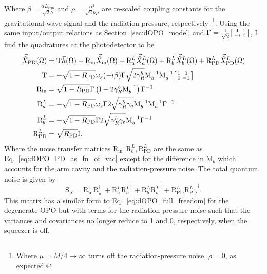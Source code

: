 Where $\beta = \frac{\alpha L_\mathrm{arm}}{\sqrt{2}\hbar}$ and $\rho = \frac{\alpha^2}{\sqrt{2}\hbar\mu}$ are re-scaled coupling constants for the gravitational-wave signal and the radiation pressure, respectively~\footnote{Where $\mu=M/4\rightarrow\infty$ turns off the radiation-pressure noise, $\rho=0$, as expected.}.
Using the same input/output relations as Section~\ref{sec:dOPO_model} and $\Gamma=\frac{1}{\sqrt2}\begin{bsmallmatrix}1 & 1 \\-i & i\end{bsmallmatrix}$, I find the quadratures at the photodetector to be
\begin{align}
\vec{\hat X}_\mathrm{PD}(\Omega)&=\text{T}\vec h(\Omega)+\text{R}_\text{in}\vec{\hat X}_\mathrm{in}(\Omega)+\text{R}^L_a\vec{\hat X}^L_a(\Omega)+\text{R}^L_b\vec{\hat X}^L_b(\Omega)+\text{R}^L_\text{PD}\vec{\hat X}^L_\text{PD}(\Omega)\\
\text{T}&=-\sqrt{1-R_\text{PD}}\omega_s(-i\beta)\Gamma \sqrt{2\gamma^b_R}\text{M}_b^{-1}\text{M}_a^{-1}\begin{bsmallmatrix}1 & 0 \\0 & -1\end{bsmallmatrix}\\
\text{R}_\text{in}&=\sqrt{1-R_\text{PD}}\Gamma\left(\text{I}-2\gamma^b_R\text{M}_b^{-1}\right)\Gamma^{-1}\\
\text{R}^L_a&=-\sqrt{1-R_\text{PD}}\omega_s\Gamma 2\sqrt{\gamma^b_R \gamma_a}\text{M}_b^{-1}\text{M}_a^{-1}\Gamma^{-1}\\
\text{R}^L_b&=-\sqrt{1-R_\text{PD}}\Gamma 2\sqrt{\gamma^b_R \gamma_b}\text{M}_b^{-1}\Gamma^{-1}\\
\text{R}^L_\text{PD}&=\sqrt{R_\text{PD}} \text{I}.
\end{align}
Where the noise transfer matrices $\text{R}_\text{in},\text{R}^L_b,\text{R}^L_\text{PD}$ are the same as Eq.~\ref{eq:dOPO_PD_as_fn_of_vac} except for the difference in $\text{M}_b$ which accounts for the arm cavity and the radiation-pressure noise. %
The total quantum noise is given by %
\begin{equation}
\text{S}_X=\text{R}_\text{in}\text{R}_\text{in}^\dag+\text{R}^L_a{\text{R}^L_a}^\dag+\text{R}^L_b{\text{R}^L_b}^\dag+\text{R}^L_\text{PD}{\text{R}^L_\text{PD}}^\dag.
\end{equation}
This matrix has a similar form to Eq.~\ref{eq:dOPO_full_freedom} for the degenerate OPO but with terms for the radiation pressure noise such that the variances and covariances no longer reduce to 1 and 0, respectively, when the squeezer is off. 
